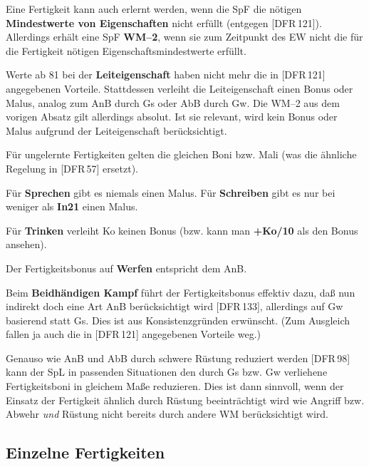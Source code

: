 \documentclass[10pt,a4paper,germanpar]{article}
\begin{document}
Eine Fertigkeit kann auch erlernt werden, wenn die SpF die nötigen
\textbf{Mindestwerte von Eigenschaften} nicht erfüllt (entgegen
[DFR\,121]). Allerdings erhält eine SpF \textbf{WM--2}, wenn sie zum
Zeitpunkt des EW nicht die für die Fertigkeit nötigen
Eigenschaftsmindestwerte erfüllt.

Werte ab 81 bei der \textbf{Leiteigenschaft} haben nicht mehr die in
[DFR\,121] angegebenen Vorteile. Stattdessen verleiht die
Leiteigenschaft einen Bonus oder Malus, analog zum AnB durch Gs oder
AbB durch Gw. Die WM--2 aus dem vorigen Absatz gilt allerdings
absolut. Ist sie relevant, wird kein Bonus oder Malus aufgrund der
Leiteigenschaft berücksichtigt.

Für ungelernte Fertigkeiten gelten die gleichen Boni bzw. Mali (was
die ähnliche Regelung in [DFR\,57] ersetzt).

Für \textbf{Sprechen} gibt es niemals einen Malus. Für
\textbf{Schreiben} gibt es nur bei weniger als \textbf{In21} einen
Malus.

Für \textbf{Trinken} verleiht Ko keinen Bonus (bzw. kann man
\textbf{+Ko/10} als den Bonus ansehen).

Der Fertigkeitsbonus auf \textbf{Werfen} entspricht dem AnB.

Beim \textbf{Beidhändigen Kampf} führt der Fertigkeitsbonus effektiv
dazu, daß nun indirekt doch eine Art AnB berücksichtigt wird
[DFR\,133], allerdings auf Gw basierend statt Gs. Dies ist aus
Konsistenzgründen erwünscht. (Zum Ausgleich fallen ja auch die in
[DFR\,121] angegebenen Vorteile weg.)

Genauso wie AnB und AbB durch schwere Rüstung reduziert werden [DFR\,98]
kann der SpL in passenden Situationen den durch Gs bzw. Gw verliehene
Fertigkeitsboni in gleichem Maße reduzieren. Dies ist dann sinnvoll,
wenn der Einsatz der Fertigkeit ähnlich durch Rüstung beeinträchtigt
wird wie Angriff bzw. Abwehr \emph{und} Rüstung nicht bereits durch
andere WM berücksichtigt wird.

\subsection{Einzelne Fertigkeiten}
\end{document}
